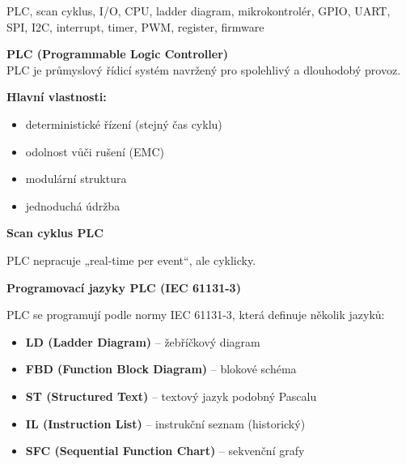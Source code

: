 \documentclass[a4paper,10pt]{article}
\begin{document}
\begin{pojmybox}
PLC, scan cyklus, I/O, CPU, ladder diagram,
mikrokontrolér, GPIO, UART, SPI, I2C,
interrupt, timer, PWM, register, firmware
\end{pojmybox}

\begin{vysvetlenibox}

\textbf{PLC (Programmable Logic Controller)}\\
PLC je průmyslový řídicí systém navržený pro spolehlivý a dlouhodobý provoz.

\textbf{Hlavní vlastnosti:}
\begin{itemize}
\item deterministické řízení (stejný čas cyklu)
\item odolnost vůči rušení (EMC)
\item modulární struktura
\item jednoduchá údržba
\end{itemize}

\textbf{Scan cyklus PLC}

\begin{center}
\end{center}

 PLC nepracuje „real-time per event“, ale cyklicky.

\textbf{Programovací jazyky PLC (IEC 61131-3)}

PLC se programují podle normy IEC 61131-3, která definuje několik jazyků:

\begin{itemize}
\item \textbf{LD (Ladder Diagram)} – žebříčkový diagram
\item \textbf{FBD (Function Block Diagram)} – blokové schéma
\item \textbf{ST (Structured Text)} – textový jazyk podobný Pascalu
\item \textbf{IL (Instruction List)} – instrukční seznam (historický)
\item \textbf{SFC (Sequential Function Chart)} – sekvenční grafy
\end{itemize}


\end{vysvetlenibox}
\end{document}
